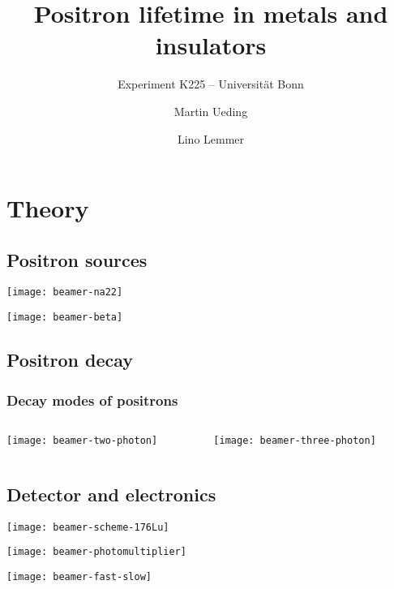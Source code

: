 \documentclass[english, fleqn]{beamer}
\title{Positron lifetime in metals and insulators}
\subtitle{Experiment K225 -- Universität Bonn}
\author{%
    Martin Ueding
    \and
    Lino Lemmer
}
\date{\daterange{2016-03-24}{2016-03-25}}
\begin{document}
\begin{frame}
    \titlepage
\end{frame}

\section{Theory}

\subsection{Positron sources}

\begin{frame}
\texttt{[image: beamer-na22]}
\end{frame}

\begin{frame}
\texttt{[image: beamer-beta]}
\end{frame}

\subsection{Positron decay}

\begin{frame}
    \frametitle{Decay modes of positrons}

    \begin{columns}[c]
        \begin{column}{.5\textwidth}
            \centering
            \texttt{[image: beamer-two-photon]}
        \end{column}
        \begin{column}{.5\textwidth}
            \centering
            \texttt{[image: beamer-three-photon]}
        \end{column}
    \end{columns}
\end{frame}

\subsection{Detector and electronics}

\begin{frame}
    \texttt{[image: beamer-scheme-176Lu]}
\end{frame}

\begin{frame}
    \texttt{[image: beamer-photomultiplier]}
\end{frame}

\begin{frame}
    \texttt{[image: beamer-fast-slow]}
\end{frame}
\end{document}
